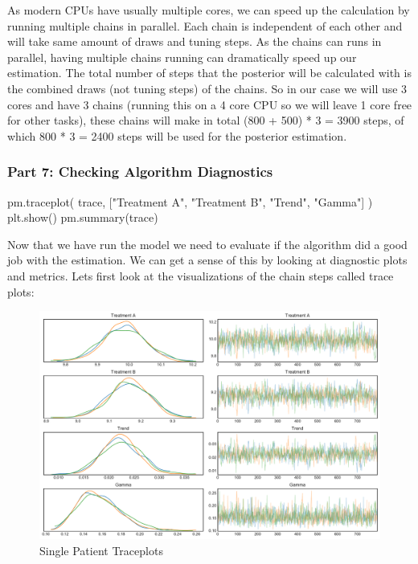 \documentclass[12pt,a4paper,leqno]{report}
\theoremstyle{plain}
\theoremstyle{definition}
\theoremstyle{remark}
\begin{document}

As modern CPUs have usually multiple cores, we can speed up the calculation by running
multiple chains in parallel. Each chain is independent of each other and will
take same amount of draws and tuning steps. As the chains can runs in parallel, having
multiple chains running can dramatically speed up our estimation. The total number of steps that
the posterior will be calculated with is the combined draws (not tuning steps) of the
chains. So in our case we will use 3 cores and have 3 chains (running this on a 4 core
CPU so we will leave 1 core free for other tasks), these chains will make in total (800 +
500) * 3 = 3900 steps, of which 800 * 3 = 2400 steps will be used for the posterior estimation.

\subsubsection*{Part 7: Checking Algorithm Diagnostics}

\bigskip
\begin{pyverbatim}[][fontsize=\footnotesize]
    pm.traceplot(
            trace, ["Treatment A", "Treatment B", "Trend", "Gamma"]
        )
    plt.show()
    pm.summary(trace)
\end{pyverbatim}
\smallskip

Now that we have run the model we need to evaluate if the algorithm did a good job with
the estimation. We can get a sense of this by looking at diagnostic plots and metrics.
Lets first look at the visualizations of the chain steps called trace plots:

\begin{figure}[H]
    \caption{Single Patient Traceplots}\label{traceplots}
    \includegraphics[width=\textwidth,height=\textheight,keepaspectratio]{single_patient_traceplot.pdf}
\end{figure}
\end{document}
